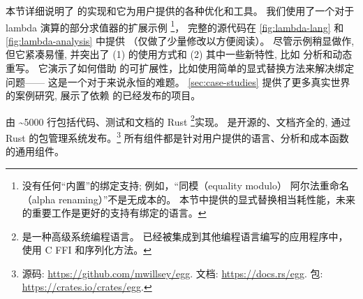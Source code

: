 本节详细说明了 \egg 的实现和它为用户提供的各种优化和工具。
我们使用了一个对于 lambda 演算的部分求值器的扩展示例 \footnote{
  \Egraphs 没有任何“内置”的绑定支持;
  例如，“同模（equality modulo） 阿尔法重命名（alpha renaming）”不是无成本的。
  本节中提供的显式替换相当耗性能，未来的重要工作是更好的支持有绑定的语言。
}，
  完整的源代码在 \autoref{fig:lambda-lang} 和 \autoref{fig:lambda-analysis} 中提供
  （仅做了少量修改以方便阅读）。
尽管示例稍显做作, 但它紧凑易懂, 并突出了
  (1) \egg 的使用方式和 (2) 其中一些新特性, 比如 \eclass 分析和动态重写。
它演示了如何借助 \egg 的可扩展性，比如使用简单的显式替换方法来解决绑定问题——
  这是一个对于\egraphs 来说永恒的难题。 
\autoref{sec:case-studies} 提供了更多真实世界的案例研究,
  展示了依赖 \egg 的已经发布的项目。

\egg 由 \textasciitilde{}5000 行包括代码、测试和文档的 Rust \footnote
{
  \citeauthor{rust} 是一种高级系统编程语言。
  \egg 已经被集成到其他编程语言编写的应用程序中，使用 C FFI 和序列化方法。
}实现。
\egg 是开源的、文档齐全的, 通过 Rust 的包管理系统发布。\footnote{
  源码: \url{https://github.com/mwillsey/egg}.
  文档: \url{https://docs.rs/egg}.
  包: \url{https://crates.io/crates/egg}.
}
\egg 所有组件都是针对用户提供的语言、分析和成本函数的通用组件。

